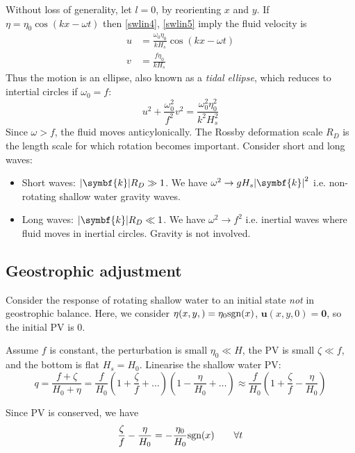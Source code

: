 \documentclass{jknotes}
\begin{document}
Without loss of generality, let $l = 0$, by reorienting $x$ and $y$. If $\eta
= \eta_0 \cos(kx-\omega t)$ then \eqref{swlin4}, \eqref{swlin5} imply the
fluid velocity is
\begin{align}
	u &= \frac{\omega_0 \eta_0}{k H_s} \cos(kx-\omega t) \\
	v &= \frac{f \eta_0}{k H_s}
\end{align}
Thus the motion is an ellipse, also known as a \emph{tidal ellipse}, which
reduces to intertial circles if $\omega_0 = f$:
\begin{equation}
	u^2 + \frac{\omega_0^2}{f^2} v^2 = \frac{\omega_0^2 \eta_0^2}{k^2 H_s^2}
\end{equation}
Since $\omega > f$, the fluid moves anticylonically. The Rossby deformation
scale $R_D$ is the length scale for which rotation becomes important. Consider
short and long waves:
\begin{itemize}
	\item Short waves: $\abs{\symbf{k}} R_D \gg 1$. We have $\omega^2 \to g H_s
		\abs{\symbf{k}}^2$ i.e. non-rotating shallow water gravity waves.
	\item Long waves: $\abs{\symbf{k}}R_D \ll 1$. We have $\omega^2 \to f^2$ i.e.
		inertial waves where fluid moves in inertial circles. Gravity is not
		involved.
\end{itemize}

\subsection{Geostrophic adjustment}
Consider the response of rotating shallow water to an initial state \emph{not}
in geostrophic balance. Here, we consider $\eta(x,y,) = \eta_0 \text{sgn}(x)$,
$\symbf{u}(x,y,0) = \symbf{0}$, so the initial PV is $0$. 


Assume $f$ is constant, the perturbation is small $\eta_0 \ll H$, the PV is
small $\zeta \ll f$, and the bottom is flat $H_s = H_0$. Linearise the shallow
water PV:
\begin{equation}
	q = \frac{f+\zeta}{H_0+\eta} = \frac{f}{H_0}\left(1+\frac{\zeta}{f} +
		\dots\right)\left(1-\frac{\eta}{H_0}+\dots\right) \approx
		\frac{f}{H_0}\left(1+\frac{\zeta}{f} - \frac{\eta}{H_0}\right)
\end{equation}

Since PV is conserved, we have
\begin{equation}
	\frac{\zeta}{f} - \frac{\eta}{H_0} = -\frac{\eta_0}{H_0} \text{sgn}(x)
	\hspace{2em} \forall t \label{eq:PVcons}
\end{equation}
\end{document}
